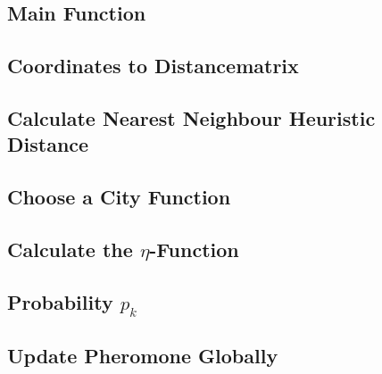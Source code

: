 \documentclass[11pt]{article}
\begin{document}
\subsection*{Main Function}
 

\subsection*{Coordinates to Distancematrix}

 

\subsection*{Calculate Nearest Neighbour Heuristic Distance}

 

\subsection*{Choose a City Function}

 

\subsection*{Calculate the $\eta$-Function}

 


\subsection*{Probability $p_k$}

 

\subsection*{Update Pheromone Globally}

 
\end{document}
